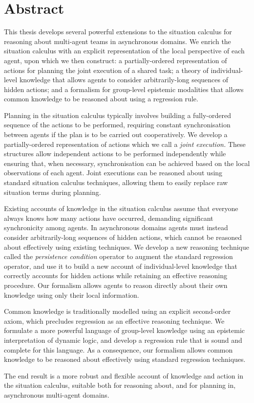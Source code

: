 

\chapter*{Abstract}

This thesis develops several powerful extensions to the situation
calculus for reasoning about multi-agent teams in asynchronous domains.
We enrich the situation calculus with an explicit representation of
the local perspective of each agent, upon which we then construct:
 a partially-ordered
representation of actions for planning the joint execution of a shared
task; a theory of individual-level knowledge that allows agents to
consider arbitrarily-long sequences of hidden actions; and a formalism
for group-level epistemic modalities that allows common knowledge to be
reasoned about using a regression rule.

Planning in the situation calculus typically involves building
a fully-ordered sequence of the actions to be performed, requiring
constant synchronisation between agents if the plan is to be carried
out cooperatively. We develop a partially-ordered representation of
actions which we call a \emph{joint execution.} These structures allow
independent actions to be performed independently while ensuring that,
when necessary, synchronisation can be achieved based on the local
observations of each agent. Joint executions can be reasoned about
using standard situation calculus techniques, allowing them to easily
replace raw situation terms during planning.

Existing accounts of knowledge in the situation calculus assume that
everyone always knows how many actions have occurred, demanding significant
synchronicity among agents. In asynchronous domains agents must instead
consider arbitrarily-long sequences of hidden actions, which cannot
be reasoned about effectively using existing techniques. We develop
a new reasoning technique called the \emph{persistence condition}
operator to augment the standard regression operator, and use it to
build a new account of individual-level knowledge that correctly accounts
for hidden actions while retaining an effective reasoning procedure.
Our formalism allows agents to reason directly about their own knowledge
using only their local information.

Common knowledge is traditionally modelled using an explicit second-order
axiom, which precludes regression as an effective reasoning technique.
We formulate a more powerful language of group-level knowledge using
an epistemic interpretation of dynamic logic, and develop a regression
rule that is sound and complete for this language. As a consequence,
our formalism allows common knowledge to be reasoned about effectively
using standard regression techniques.

The end result is a more robust and flexible account of knowledge
and action in the situation calculus, suitable both for reasoning about, and
for planning in, asynchronous multi-agent domains.
